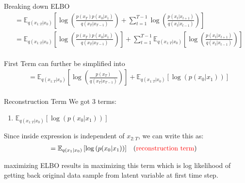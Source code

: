 \begin{frame}{Breaking down ELBO}
    \begin{align*}
        &= \mathbb{E}_{q(x_{1:T}|x_0)} \left[ \log \left( \frac{p(x_T)p(x_0|x_1)}{q(x_T|x_{T-1})} \right) + \sum_{t=1}^{T-1} \log \left( \frac{p(x_{t}|x_{t+1})}{q(x_t|x_{t-1})} \right) \right] \\
        &= \mathbb{E}_{q(x_{1:T}|x_0)} \left[ \log \left( \frac{p(x_T)p(x_0|x_1)}{q(x_T|x_{T-1})} \right) \right] + \sum_{t=1}^{T-1} \mathbb{E}_{q(x_{1:T}|x_0)} \left[ \log \left( \frac{p(x_{t}|x_{t+1})}{q(x_t|x_{t-1})} \right) \right] \\
    \end{align*}

    First Term can further be simplified into
    \begin{align*}
        &= \mathbb{E}_{q(x_{1:T}|x_0)} \left[ \log \left( \frac{p(x_T)}{q(x_T|x_{T-1})} \right) \right] + \mathbb{E}_{q(x_{1:T}|x_0)} \left[ \log \left( p(x_0|x_1) \right) \right] \\
    \end{align*}
\end{frame}

\begin{frame}{Reconstruction Term}
    We got 3 terms:
    \begin{enumerate}
        \item $\mathbb{E}_{q(x_{1:T}|x_0)} \left[ \log \left( p(x_0|x_1) \right) \right]$
    \end{enumerate}
    \bigskip
    Since inside expression is independent of $x_{2:T}$, we can write this as:
    \begin{align*}
        &= \mathbb{E}_{q(x_{1}|x_0)} \left[ \log \left( p(x_0|x_1) \right) \right] && \text{(\textcolor{red}{reconstruction term})}
    \end{align*}

    maximizing ELBO results in maximizing this term which is log likelihood of getting back original data sample from latent variable at first time step.
\end{frame}

